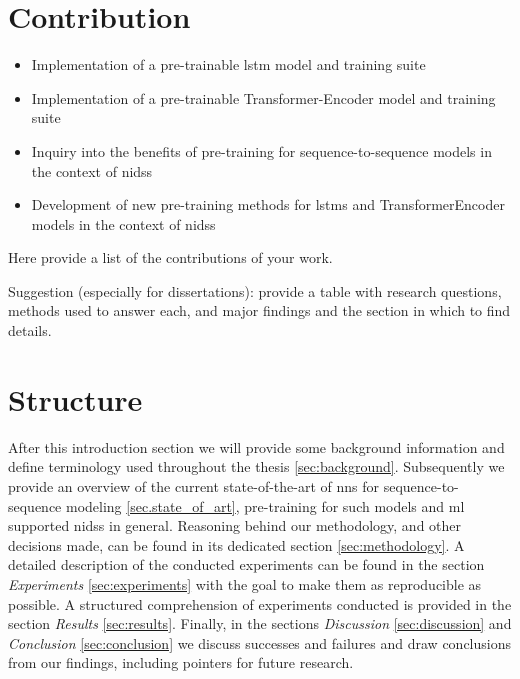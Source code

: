 \section{Contribution} \label{sect.contribution}

\begin{itemize}
	\item Implementation of a pre-trainable \gls{lstm} model and training suite
	\item Implementation of a pre-trainable Transformer-Encoder model and training suite
	\item Inquiry into the benefits of pre-training for sequence-to-sequence models in the context of \glspl{nids}
	\item Development of new pre-training methods for \glspl{lstm} and TransformerEncoder models in the context of \glspl{nids}
\end{itemize}

Here provide a list of the contributions of your work.

Suggestion (especially for dissertations): provide a table with research questions, methods used to answer each, and major findings and the section in which to find details.

\section{Structure} \label{sect.structure}

After this introduction section we will provide some background information and define terminology used throughout the thesis \ref{sec:background}. Subsequently we provide an overview of the current state-of-the-art of \glspl{nn} for sequence-to-sequence modeling \ref{sec.state_of_art}, pre-training for such models and \gls{ml} supported \glspl{nids} in general. Reasoning behind our methodology, and other decisions made, can be found in its dedicated section \ref{sec:methodology}. A detailed description of the conducted experiments can 
be found in the section \textit{Experiments} \ref{sec:experiments} with the goal to make them as reproducible as possible. A structured comprehension of experiments conducted is provided in the section \textit{Results} \ref{sec:results}. Finally, in the sections \textit{Discussion} \ref{sec:discussion} and \textit{Conclusion} \ref{sec:conclusion} we discuss successes and failures and draw conclusions from our findings, including pointers for future research. 


\newpage